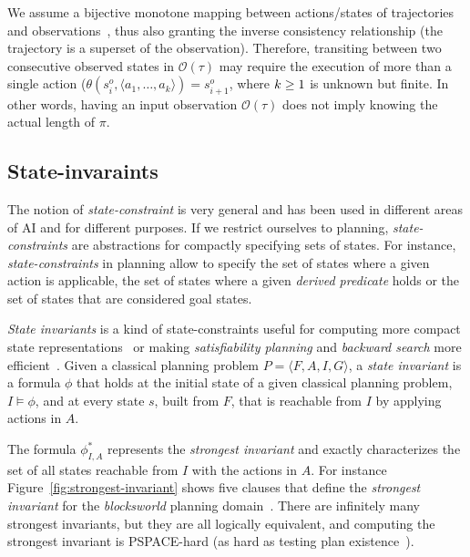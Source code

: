 \documentclass{article}
\newcommand{\tup}[1]{{\langle #1 \rangle}}
\begin{document}
We assume a bijective monotone mapping between actions/states of trajectories and observations~\cite{ramirez2009plan}, thus also granting the inverse consistency relationship (the trajectory is a superset of the observation). Therefore, transiting between two consecutive observed states in $\mathcal{O}(\tau)$ may require the execution of more than a single action ($\theta(s_i^o,\tup{a_1,\ldots,a_k})=s_{i+1}^o$, where ${\small k\geq 1}$ is unknown but finite. In other words, having an input observation $\mathcal{O}(\tau)$ does not imply knowing the actual length of $\pi$.

\subsection{State-invaraints}
The notion of {\em state-constraint} is very general and has been used in different areas of AI and for different purposes.  If we restrict ourselves to planning, {\em state-constraints} are abstractions for compactly specifying sets of states. For instance, {\em state-constraints} in planning allow to specify the set of states where a given action is applicable, the set of states where a given {\em derived predicate} holds or the set of states that are considered goal states.

{\em State invariants} is a kind of state-constraints useful for computing more compact state representations~\cite{helmert2009concise} or making {\em satisfiability planning} and {\em backward search} more efficient~\cite{rintanen2014madagascar,alcazar2015reminder}. Given a classical planning problem $P=\tup{F,A,I,G}$, a {\em state invariant} is a formula $\phi$ that holds at the initial state of a given classical planning problem, $I\models \phi$, and at every state $s$, built from $F$, that is reachable from $I$ by applying actions in $A$.

The formula $\phi_{I,A}^*$ represents the {\em strongest invariant} and exactly characterizes the set of all states reachable from $I$ with the actions in $A$. For instance Figure~\ref{fig:strongest-invariant} shows five clauses that define the {\em strongest invariant} for the {\em blocksworld} planning domain~\cite{slaney2001blocks}. There are infinitely many strongest invariants, but they are all logically equivalent, and computing the strongest invariant is PSPACE-hard (as hard as testing plan existence~\cite{bylander:complexity:AIJ1994}).
\end{document}
